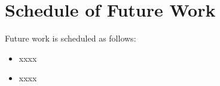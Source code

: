 \section{Schedule of Future Work}
\label{sec:Schedule}

Future work is scheduled as follows:
\begin{itemize}
  \item xxxx
  \item xxxx
\end{itemize}
